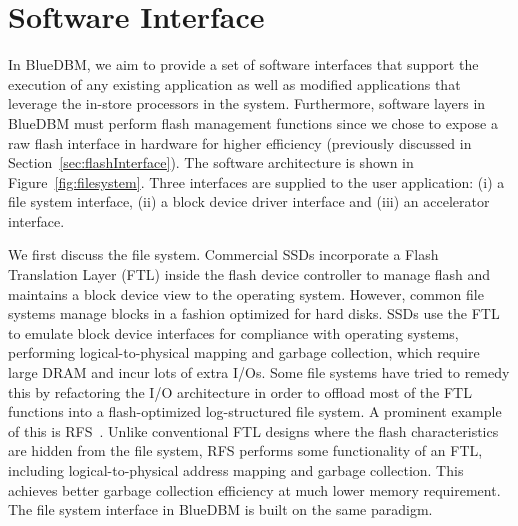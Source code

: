 \section{Software Interface}
\label{sec:software}

In BlueDBM, we aim to provide a set of software interfaces that support the
execution of any existing application as well as modified applications that
leverage the in-store processors in the system. Furthermore, software layers in
BlueDBM must perform flash management functions since we chose to expose a
raw flash interface in hardware for higher efficiency (previously discussed in
Section~\ref{sec:flashInterface}). The software architecture is shown in
Figure~\ref{fig:filesystem}.  Three interfaces are supplied to the user
application: (i) a file system interface, (ii) a block device driver interface
and (iii) an accelerator interface. 


We first discuss the file system. Commercial SSDs incorporate a Flash
Translation Layer (FTL) inside the flash device controller to manage flash and
maintains a block device view to the operating system.  However, common file
systems manage blocks in a fashion optimized for hard disks.  SSDs use
the FTL to emulate block device interfaces for compliance with operating systems, performing
logical-to-physical mapping and garbage collection, which require large DRAM
and incur lots of extra I/Os. Some file systems have tried to remedy this by
refactoring the I/O architecture in order to offload most of the FTL functions
into a flash-optimized log-structured file system. A prominent example of this
is RFS~\cite{rfs}.  Unlike conventional FTL designs where the flash
characteristics are hidden from the file system, RFS performs some
functionality of an FTL, including logical-to-physical address mapping and
garbage collection.  This achieves better garbage collection efficiency at much
lower memory requirement. The file system interface in BlueDBM is built on
the same paradigm. 

